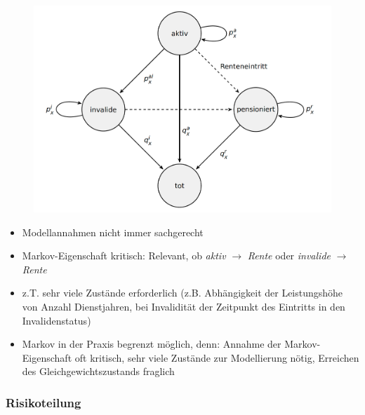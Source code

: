 \documentclass[12pt]{report}
\theoremstyle{dotless}
\theoremstyle{definition}
\begin{document}
\begin{figure}[ht]
	\centering
	\includegraphics[width = .8\textwidth]{Bilder/ZustandsmodellPersVers}
\end{figure}
 \begin{itemize}
 	\item Modellannahmen nicht immer sachgerecht
 	\item Markov-Eigenschaft kritisch: Relevant, ob \textit{aktiv} $\rightarrow$ \textit{Rente} oder \textit{invalide} $\rightarrow$ \textit{Rente}
 	\item z.T. sehr viele Zustände erforderlich (z.B. Abhängigkeit der Leistungshöhe von Anzahl Dienstjahren, bei Invalidität der Zeitpunkt des Eintritts in den Invalidenstatus)
 	\item Markov in der Praxis begrenzt möglich, denn: Annahme der Markov-Eigenschaft oft kritisch, sehr viele Zustände zur Modellierung nötig, Erreichen des Gleichgewichtszustands fraglich
 \end{itemize}

\subsubsection{Risikoteilung}
\end{document}
